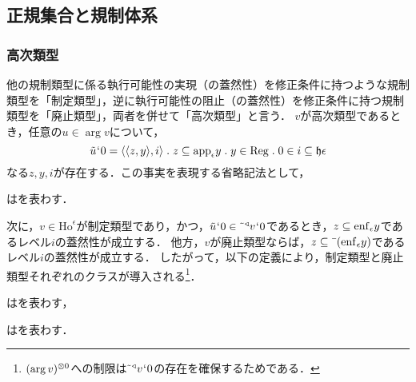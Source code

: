 
\subsection{正規集合と規制体系}
\label{ssec:正規集合と規制体系}

\subsubsection{高次類型}
\label{sssec:高次類型}

他の規制類型に係る執行可能性の実現（の蓋然性）を修正条件に持つような規制類型を「制定類型」，逆に執行可能性の阻止（の蓋然性）を修正条件に持つ規制類型を「廃止類型」，両者を併せて「高次類型」と言う．
$ v $が高次類型であるとき，任意の$ u\in\arg v $について，
\[
    \tilde{u}\fap 0 = \orp{\orp{z,y},i}\con{1}z\subseteq\app{\epsilon}y\con{1}y\in\mathrm{Reg}\con{1}0\in i\subseteq\indx{\epsilon}
\]
なる$ z,y,i $が存在する．この事実を表現する省略記法として，
\begin{df}
\label{df:高次類型}
はを表わす．
\end{df}
\noindent 次に，$v\in\mathrm{Ho}^{\epsilon}$が制定類型であり，かつ，$ \tilde{u}{\mspace{1mu}{`}\mspace{1mu}} 0\in \tilde{\:\:}{^\triangleleft}v{\mspace{1mu}{`}\mspace{1mu}} 0 $であるとき，$z\subseteq\mathrm{enf}_{\epsilon}y$であるレベル$i$の蓋然性が成立する．
他方，$v$が廃止類型ならば，$z\subseteq\bar{\:\:}(\mathrm{enf}_{\epsilon}y)$であるレベル$i$の蓋然性が成立する．
したがって，以下の定義により，制定類型と廃止類型それぞれのクラスが導入される\footnote{
    $ (\arg v)^{\otimes 0} $への制限は$ \tilde{\:\:}{^\triangleleft}v{\mspace{1mu}{`}\mspace{1mu}} 0 $の存在を確保するためである．
}．

\begin{df}
\label{df:制定類型}
はを表わす，
\end{df}

\begin{df}
\label{df:廃止類型}
はを表わす．
\end{df}

